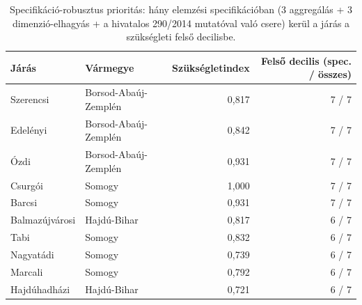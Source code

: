 \begin{table}[htbp]
\centering
\small
\begin{tabular}{llrr}
\toprule
Járás & Vármegye & Szükségletindex & Felső decilis (spec. / összes) \\
\midrule
Szerencsi & Borsod-Abaúj-Zemplén & 0{,}817 & 7 / 7 \\
Edelényi & Borsod-Abaúj-Zemplén & 0{,}842 & 7 / 7 \\
Ózdi & Borsod-Abaúj-Zemplén & 0{,}931 & 7 / 7 \\
Csurgói & Somogy & 1{,}000 & 7 / 7 \\
Barcsi & Somogy & 0{,}931 & 7 / 7 \\
Balmazújvárosi & Hajdú-Bihar & 0{,}817 & 6 / 7 \\
Tabi & Somogy & 0{,}832 & 6 / 7 \\
Nagyatádi & Somogy & 0{,}739 & 6 / 7 \\
Marcali & Somogy & 0{,}792 & 6 / 7 \\
Hajdúhadházi & Hajdú-Bihar & 0{,}721 & 6 / 7 \\
\bottomrule
\end{tabular}
\caption{Specifikáció-robusztus prioritás: hány elemzési specifikációban (3 aggregálás + 3 dimenzió-elhagyás + a hivatalos 290/2014 mutatóval való csere) kerül a járás a szükségleti felső decilisbe.}
\label{tab:specrobust}
\end{table}
